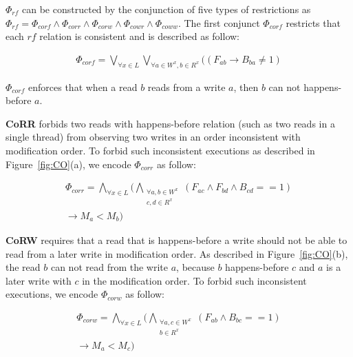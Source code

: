 \documentclass[preprint, numbers, 10pt]{sigplanconf}
\begin{document}
$\Phi_{rf}$ can be constructed by the conjunction of five
types of restrictions as $\Phi_{rf}=\Phi_{corf}\wedge\Phi_{corr}\wedge \Phi_{corw}
\wedge\Phi_{cowr}\wedge\Phi_{coww}$. The first conjunct $\Phi_{corf}$ restricts that each $rf$ relation
is consistent and is described as follow: 

\begin{equation}
\begin{aligned}
\Phi_{corf} = \bigvee_{\forall x\in L }\bigvee_{\forall a\in W^x, b\in R^x} ((F_{ab}\rightarrow B_{ba}\neq 1) 
\end{aligned}
\end{equation} 

$\Phi_{corf}$ enforces that when a read $b$ reads from a write $a$, 
then $b$ can not happens-before $a$. 

\textbf{CoRR} forbids two reads with happens-before relation (such as two reads
in a single thread) from observing two writes in an order inconsistent with modification order. 
To forbid such inconsistent executions as described in Figure~\ref{fig:CO}(a), 
we encode $\Phi_{corr}$ as follow: 

\begin{equation}
\begin{aligned}
\Phi_{corr} = \bigwedge_{\forall x\in L}(\bigwedge_{\substack{\forall a,b\in W^x\\c,d\in R^x}} 
(F_{ac}\wedge F_{bd}\wedge B_{cd}==1) \\
\rightarrow M_{a}<M_{b})
\end{aligned}
\end{equation} 

\textbf{CoRW} requires that a read that is happens-before a 
write should not be able to read from a later write in modification order.
As described in Figure~\ref{fig:CO}(b), the read $b$ can not read from
the write $a$, because $b$ happens-before $c$ and $a$ is a later write 
with $c$ in the modification order. To forbid such inconsistent executions, we 
encode $\Phi_{corw}$ as follow: 

\begin{equation}
\begin{aligned}
\Phi_{corw} = \bigwedge_{\forall x\in L}(\bigwedge_{\substack{\forall a,c\in W^x\\b\in R^x}}
(F_{ab}\wedge B_{bc}==1)\\ \rightarrow M_{a}<M_{c})
\end{aligned}
\end{equation} 
\end{document}

